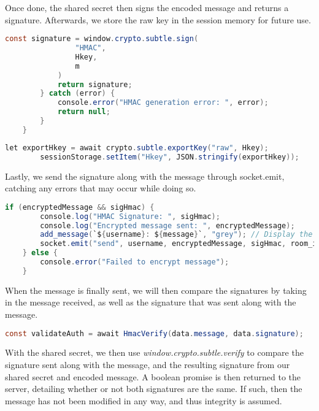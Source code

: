 \documentclass{article}
\begin{document}
Once done, the shared secret then signs the encoded message and returns a signature. Afterwards, we store the raw key in the session memory for future use.

\begin{lstlisting}[language=Java]
            const signature = window.crypto.subtle.sign(
                "HMAC",
                Hkey,
                m 
            )
            return signature;
        } catch (error) {
            console.error("HMAC generation error: ", error);
            return null; 
        }
    }
\end{lstlisting}

\begin{lstlisting}[language=Java]
        let exportHkey = await crypto.subtle.exportKey("raw", Hkey);
        sessionStorage.setItem("Hkey", JSON.stringify(exportHkey));
\end{lstlisting}

Lastly, we send the signature along with the message through socket.emit, catching any errors that may occur while doing so.

\begin{lstlisting}[language=Java]
    if (encryptedMessage && sigHmac) {
        console.log("HMAC Signature: ", sigHmac);
        console.log("Encrypted message sent: ", encryptedMessage);
        add_message(`${username}: ${message}`, "grey"); // Display the original message directly
        socket.emit("send", username, encryptedMessage, sigHmac, room_id);
    } else {
        console.error("Failed to encrypt message");
    }
\end{lstlisting}

When the message is finally sent, we will then compare the signatures by taking in the message received, as well as the signature that was sent along with the message.

\begin{lstlisting}[language=Java]
const validateAuth = await HmacVerify(data.message, data.signature);
\end{lstlisting}

With the shared secret, we then use \textit{window.crypto.subtle.verify} to compare the signature sent along with the message, and the resulting signature from our shared secret and encoded message. A boolean promise is then returned to the server, detailing whether or not both signatures are the same. If such, then the message has not been modified in any way, and thus integrity is assumed.
\end{document}
